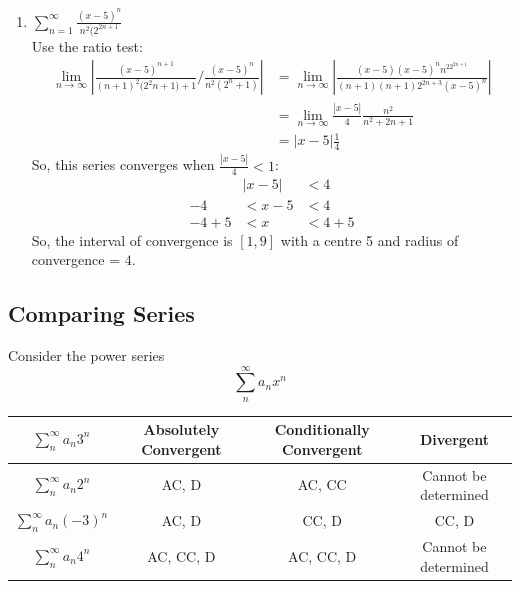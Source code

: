 \documentclass{article}
\begin{document}
\begin{enumerate}
    \item $\sum_{n=1}^\infty \frac{(x-5)^n}{n^2 (2^{2n+1}}$\\
    Use the ratio test:
    \begin{align*}
        \lim_{n\to\infty} |\frac{(x-5)^{n+1}}{(n+1)^2(2^2{n+1)+1}} / \frac{(x-5)^n}{n^2(2^n+1)}| & = \lim_{n\to\infty} |\frac{(x-5)(x-5)^n n^22^{2n+1}}{(n+1)(n+1)2^{2n+3}(x-5)^n}|\\
        & = \lim_{n\to\infty} \frac{|x-5|}{4} \frac{n^2}{n^2+2n+1}\\
        & = |x-5|\frac{1}{4}
    \end{align*}
    So, this series converges when $\frac{|x-5|}{4} < 1$:
    \begin{align*}
        & |x-5| & < 4\\
        -4 & < x - 5 & < 4\\
        -4 + 5 & < x & < 4 + 5
    \end{align*}
    So, the interval of convergence is $[1,9]$ with a centre 5 and radius of convergence = $4$.
\end{enumerate}

\subsection{Comparing Series}
Consider the power series
$$\sum_n^\infty a_n x^n$$

\begin{center}
    \begin{tabular}{c | c | c | c}
         $\sum_n^\infty a_n3^n$ & Absolutely Convergent & Conditionally Convergent & Divergent  \\
         \hline
         $\sum_n^\infty a_n2^n$ & AC, D & AC, CC & Cannot be determined\\
         $\sum_n^\infty a_n(-3)^n$ & AC, D & CC, D & CC, D\\
         $\sum_n^\infty a_n4^n$ & AC, CC, D & AC, CC, D & Cannot be determined
    \end{tabular}
\end{center}
\end{document}
